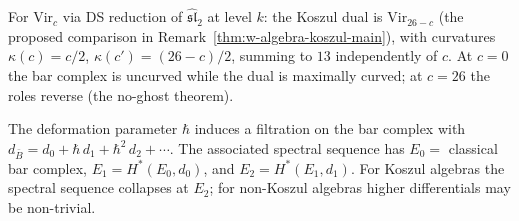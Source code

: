 \begin{computation}
\label{comp:dq-koszul-vir}
For $\mathrm{Vir}_c$ via DS reduction of $\widehat{\mathfrak{sl}}_2$ at level $k$: the Koszul dual is $\mathrm{Vir}_{26-c}$ (the proposed comparison in Remark~\ref{thm:w-algebra-koszul-main}), with curvatures $\kappa(c)=c/2$, $\kappa(c')=(26-c)/2$, summing to $13$ independently of $c$.  At $c=0$ the bar complex is uncurved while the dual is maximally curved; at $c=26$ the roles reverse (the no-ghost theorem).
\end{computation}

\begin{remark}
\label{rem:filtered-dq}
The deformation parameter $\hbar$ induces a filtration on the bar complex with $d_{\bar{B}} = d_0 + \hbar\, d_1 + \hbar^2\, d_2 + \cdots$.  The associated spectral sequence has $E_0 =$ classical bar complex, $E_1 = H^*(E_0, d_0)$, and $E_2 = H^*(E_1, d_1)$.  For Koszul algebras the spectral sequence collapses at $E_2$; for non-Koszul algebras higher differentials may be non-trivial.
\end{remark}
